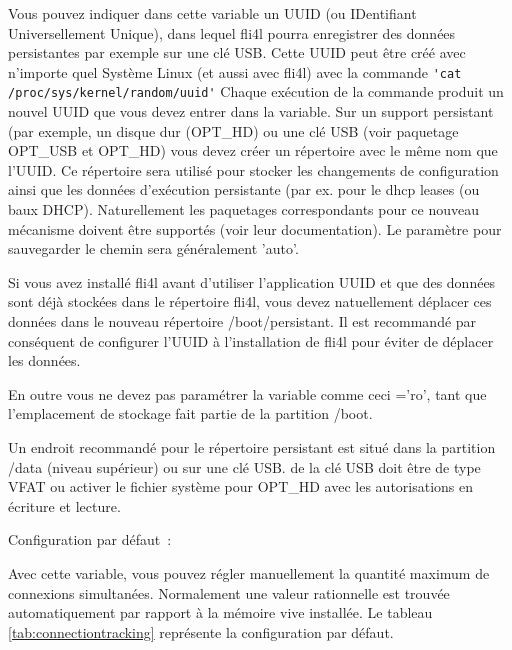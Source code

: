 \begin{description}
  {Vous pouvez indiquer dans cette variable un UUID (ou IDentifiant Universellement
  Unique), dans lequel fli4l pourra enregistrer des données persistantes par
  exemple sur une clé USB. Cette UUID peut être créé avec n'importe quel
  Système Linux (et aussi avec fli4l) avec la commande \verb*?'cat /proc/sys/kernel/random/uuid'?
  Chaque exécution de la commande produit un nouvel UUID que vous devez entrer
  dans la variable. Sur un support persistant (par exemple, un disque dur
  (OPT\_HD) ou une clé USB (voir paquetage OPT\_USB et OPT\_HD) vous devez créer un
  répertoire avec le même nom que l'UUID. Ce répertoire sera utilisé pour stocker
  les changements de configuration ainsi que les données d'exécution persistante
  (par ex. pour le dhcp leases (ou baux DHCP). Naturellement les paquetages
  correspondants pour ce nouveau mécanisme doivent être supportés (voir leur
  documentation). Le paramètre pour sauvegarder le chemin sera généralement 'auto'.

  Si vous avez installé fli4l avant d'utiliser l'application UUID et que des
  données sont déjà stockées dans le répertoire fli4l, vous devez natuellement
  déplacer ces données dans le nouveau répertoire /boot/persistant. Il est 
  recommandé par conséquent de configurer l'UUID à l'installation de fli4l pour
  éviter de déplacer les données.

  En outre vous ne devez pas paramétrer la variable comme ceci ='ro',
  tant que l'emplacement de stockage fait partie de la partition /boot.

  Un endroit recommandé pour le répertoire persistant est situé dans la partition
  /data (niveau supérieur) ou sur une clé USB.  de la clé USB
  doit être de type VFAT ou activer le fichier système pour OPT\_HD avec les
  autorisations en écriture et lecture.}


  Configuration par défaut~: 

  Avec cette variable, vous pouvez régler manuellement la quantité
  maximum de connexions simultanées. Normalement une valeur rationnelle
  est trouvée automatiquement par rapport à la mémoire vive installée.
  Le tableau \ref{tab:connectiontracking} représente la configuration par défaut.


\end{description}
